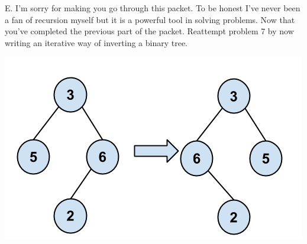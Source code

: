 \documentclass[12pt]{article}
\begin{document}
\newpage
\noindent E. I'm sorry for making you go through this packet. To be honest I've never been a fan of recursion myself but it is a powerful tool in solving problems. Now that you've completed the previous part of the packet. Reattempt problem 7 by now writing an iterative way of inverting a binary tree.
\centerline{\includegraphics[scale = 0.4]{invertbtree.png}}
\end{document}
